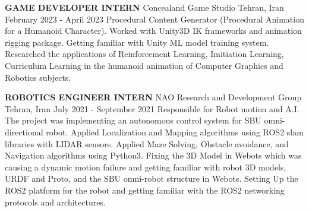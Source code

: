 \begin{cventries}
		
    \cventry
    {\textbf{GAME DEVELOPER INTERN}}
    {Concealand Game Studio}
    {Tehran, Iran}
    {February 2023 - April 2023}
    {Procedural Content Generator (Procedural Animation for a Humanoid Character). \newline Worked with Unity3D IK frameworks and animation rigging package. \newline Getting familiar with Unity ML model training system. \newline Researched the applications of Reinforcement Learning, Imitiation Learning, Curriculum Learning in the humanoid animation of Computer Graphics and Robotics subjects.}   
    
\vspace{0.4 cm}

    \cventry
    {\textbf{ROBOTICS ENGINEER INTERN}}
    {NAO Research and Development Group}
    {Tehran, Iran}
    {July 2021 - September 2021}
    {Responsible for Robot motion and A.I. \newline The project was implementing an autonomous control system for SBU omni-directional robot. Applied Localization and Mapping algorithms using ROS2 slam libraries with LIDAR sensors. \newline Applied Maze Solving, Obstacle avoidance, and Navigation algorithms using Python3. \newline Fixing the 3D Model in Webots which was causing a dynamic motion failure and getting familiar with robot 3D models, URDF and Proto, and the SBU omni-robot structure in Webots. \newline Setting Up the ROS2 platform for the robot and getting familiar with the ROS2 networking protocols and architectures.}   
    
\end{cventries}

